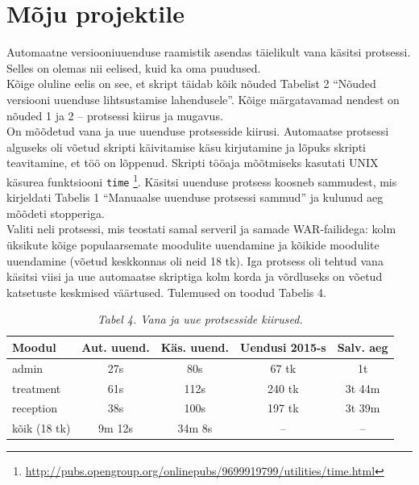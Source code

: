 \documentclass[12pt]{report}
\newcommand{\code}[1]{\texttt{#1}}
\begin{document}
  \newpage
  
  \section{Mõju projektile}
  
  Automaatne versiooniuuenduse raamistik asendas täielikult vana käsitsi protsessi. Selles on olemas nii eelised, kuid ka oma puudused.\\
  
  Kõige oluline eelis on see, et skript täidab kõik nõuded Tabelist 2 ``Nõuded versiooni uuenduse lihtsustamise lahendusele''. Kõige märgatavamad nendest on nõuded 1 ja 2 \--- protsessi kiirus ja mugavus.\\
  
  On mõõdetud vana ja uue uuenduse protsesside kiirusi. Automaatse protsessi alguseks oli võetud skripti käivitamise käsu kirjutamine ja lõpuks skripti teavitamine, et töö on lõppenud. Skripti tööaja mõõtmiseks kasutati UNIX käsurea funktsiooni \code{time} \footnote{\url{http://pubs.opengroup.org/onlinepubs/9699919799/utilities/time.html}}. Käsitsi uuenduse protsess koosneb sammudest, mis kirjeldati Tabelis 1 ``Manuaalse uuenduse protsessi sammud'' ja kulunud aeg mõõdeti stopperiga.\\
  
  Valiti neli protsessi, mis teostati samal serveril ja samade WAR\--failidega: kolm üksikute kõige populaarsemate moodulite uuendamine ja kõikide moodulite uuendamine (võetud keskkonnas oli neid 18 tk). Iga protsess oli tehtud vana käsitsi viisi ja uue automaatse skriptiga kolm korda ja võrdluseks on võetud katsetuste keskmised väärtused. Tulemused on toodud Tabelis 4.
  
  \begin{table}[!htbp]
    \begin{center}
      \caption*{\textit{Tabel 4. Vana ja uue protsesside kiirused.}}
      
      \begin{tabular}{| l | c | c | c | c |}
        \hline
         \textbf{Moodul} & \textbf{Aut. uuend.} & \textbf{Käs. uuend.} & \textbf{Uendusi 2015-s} & \textbf{Salv. aeg}\\
        \hline
        admin & 27s & 80s & 67 tk & 1t\\
        treatment & 61s & 112s & 240 tk & 3t 44m\\
        reception & 38s & 100s & 197 tk & 3t 39m \\
        kõik (18 tk) & 9m 12s & 34m 8s & \--- & \---\\
        \hline
      \end{tabular}
    \end{center}
  \end{table}
  
\end{document}
